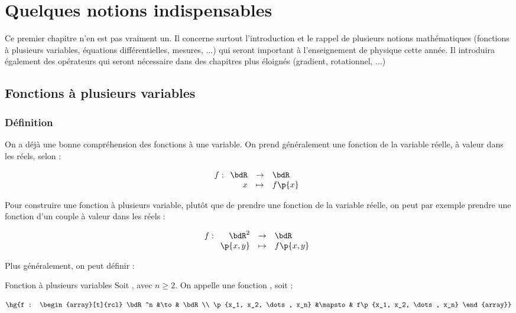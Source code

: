    \chapter{Quelques notions indispensables}
    
    Ce premier chapitre n'en est pas vraiment un. Il concerne surtout l'introduction et le rappel de plusieurs notions mathématiques (fonctions à plusieurs variables, équations différentielles, mesures, ...) qui seront important à l'enseignement de physique cette année. Il introduira également des opérateurs qui seront nécessaire dans des chapitres plus éloignés (gradient, rotationnel, ...)
    
    \chaptertoc
    
    \section{Fonctions à plusieurs variables}
    
    \subsection{Définition}
    
    On a déjà une bonne compréhension des fonctions à une variable. On prend généralement une fonction de la variable réelle, à valeur dans les réels, selon : 
    
    \[ f : \begin{array}[t]{rcl}
        \bdR &\to& \bdR  \\
        x &\mapsto& f\p{x} 
        \end{array}
    \]
    
    Pour construire une fonction à plusieurs variable, plutôt que de prendre une fonction de la variable réelle, on peut par exemple prendre une fonction d'un couple à valeur dans les réels :
    
    \[ f : \begin{array}[t]{rcl}
        \bdR^2 &\to& \bdR  \\
        \p{x, y} &\mapsto& f\p{x,y} 
        \end{array}
    \]
    
    Plus généralement, on peut définir :
    
    \begin{definition}{Fonction à plusieurs variables}
        Soit , avec $n \geq 2$. On appelle  une fonction , soit :
        
        \[ \hg{f : \begin{array}[t]{rcl}
        \bdR^n &\to& \bdR  \\
        \p{x_1, x_2, \dots, x_n} &\mapsto& f\p{x_1, x_2, \dots, x_n} 
        \end{array}}\]
    
    \end{definition}
    
